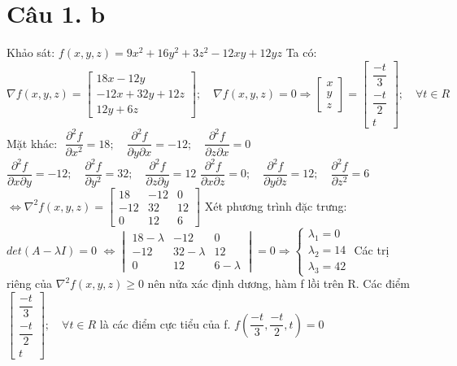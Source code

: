 \documentclass[11pt]{article}
\begin{document}
\section*{Câu 1. b}
Khảo sát: $ f(x, y, z) = 9x^2 + 16y^2 + 3z^2 - 12xy + 12yz $
\newline Ta có: $ \nabla f(x, y, z) = \begin{bmatrix}
    18x - 12y \\
    -12x + 32y + 12z \\
    12y + 6z
\end{bmatrix}; \quad \nabla f(x, y, z) = 0 \Rightarrow \begin{bmatrix}
    x \\ y \\ z
\end{bmatrix} = \begin{bmatrix}
    \dfrac{-t}{3} \\
    \dfrac{-t}{2} \\
    t
\end{bmatrix}; \quad \forall t \in R $
\newline Mặt khác: $ $
\newline $ \dfrac{\partial^2 f}{\partial x^2} = 18; \quad \dfrac{\partial^2 f}{\partial y \partial x} = -12; \quad \dfrac{\partial^2 f}{\partial z \partial x} = 0 $
\newline $ \dfrac{\partial^2 f}{\partial x \partial y} = -12; \quad \dfrac{\partial^2 f}{\partial y^2} = 32; \quad \dfrac{\partial^2 f}{\partial z \partial y} = 12 $
\newline $ \dfrac{\partial^2 f}{\partial x \partial z} = 0; \quad \dfrac{\partial^2 f}{\partial y \partial z} = 12; \quad \dfrac{\partial^2 f}{\partial z^2} = 6 $
\newline $ \Leftrightarrow \nabla^2 f(x, y, z) = \begin{bmatrix}
    18 & -12 & 0 \\
    -12 & 32 & 12 \\
    0 & 12 & 6
\end{bmatrix} $
\newline Xét phương trình đặc trưng: $ det(A - \lambda I) = 0 $
\newline $ \Leftrightarrow \begin{vmatrix}
    18 - \lambda & -12 & 0 \\
    -12 & 32 - \lambda & 12 \\
    0 & 12 & 6 - \lambda
\end{vmatrix} = 0 \Rightarrow \begin{cases}
    \lambda_1 = 0 \\
    \lambda_2 = 14 \\
    \lambda_3 = 42
\end{cases} $
\newline Các trị riêng của $ \nabla^2 f(x, y, z) \ge 0 $ nên nửa xác định dương, hàm f lồi trên R.
\newline Các điểm $ \begin{bmatrix}
    \dfrac{-t}{3} \\
    \dfrac{-t}{2} \\
    t
\end{bmatrix}; \quad \forall t \in R $ là các điểm cực tiểu của f. $ f(\dfrac{-t}{3}, \dfrac{-t}{2}, t) = 0$
\end{document}
